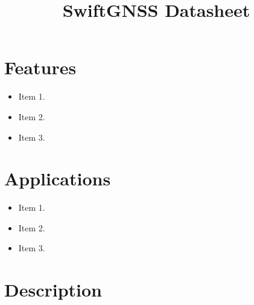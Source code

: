 \documentclass{article}
\title{\Huge{\textbf{\color{sections}SwiftGNSS Datasheet}}}
\author{}
\date{\vspace{-20pt}}
\begin{document}

\begin{center}
\end{center}
\vspace{10pt}

\begin{multicols*}{2}
\raggedcolumns

\section*{Features}
\large
\label{sec:Features}
\begin{itemize}
  \bulletnoindent
  \item Item 1.
  \item Item 2.
  \item Item 3.
\end{itemize}
\normalsize

\section*{Applications}
\large
\label{sec:Applications}
\begin{itemize}
  \bulletnoindent
  \item Item 1.
  \item Item 2.
  \item Item 3.
\end{itemize}
\normalsize

\section*{Description}

\lipsum[1-3]


\end{multicols*}
\end{document}
